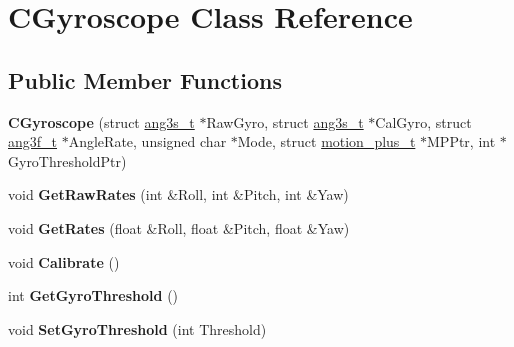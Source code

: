 \hypertarget{class_c_gyroscope}{\section{\-C\-Gyroscope \-Class \-Reference}
\label{class_c_gyroscope}
}
\subsection*{\-Public \-Member \-Functions}
\begin{DoxyCompactItemize}
\item 
\hypertarget{class_c_gyroscope_a065f7be42b432dbc9f57c0a3a9e2b88b}{{\bfseries \-C\-Gyroscope} (struct \hyperlink{structang3s__t}{ang3s\-\_\-t} $\ast$\-Raw\-Gyro, struct \hyperlink{structang3s__t}{ang3s\-\_\-t} $\ast$\-Cal\-Gyro, struct \hyperlink{structang3f__t}{ang3f\-\_\-t} $\ast$\-Angle\-Rate, unsigned char $\ast$\-Mode, struct \hyperlink{structmotion__plus__t}{motion\-\_\-plus\-\_\-t} $\ast$\-M\-P\-Ptr, int $\ast$\-Gyro\-Threshold\-Ptr)}\label{class_c_gyroscope_a065f7be42b432dbc9f57c0a3a9e2b88b}

\item 
\hypertarget{class_c_gyroscope_ab8d7db3bf44a8686d91e8fae5824af97}{void {\bfseries \-Get\-Raw\-Rates} (int \&\-Roll, int \&\-Pitch, int \&\-Yaw)}\label{class_c_gyroscope_ab8d7db3bf44a8686d91e8fae5824af97}

\item 
\hypertarget{class_c_gyroscope_a96b2a55ace21483305ef3f64bf415092}{void {\bfseries \-Get\-Rates} (float \&\-Roll, float \&\-Pitch, float \&\-Yaw)}\label{class_c_gyroscope_a96b2a55ace21483305ef3f64bf415092}

\item 
\hypertarget{class_c_gyroscope_a690a6e901390f2b57d0e48c03d00bc0f}{void {\bfseries \-Calibrate} ()}\label{class_c_gyroscope_a690a6e901390f2b57d0e48c03d00bc0f}

\item 
\hypertarget{class_c_gyroscope_a36ee104d7a2304c3b414cf48910c9fcb}{int {\bfseries \-Get\-Gyro\-Threshold} ()}\label{class_c_gyroscope_a36ee104d7a2304c3b414cf48910c9fcb}

\item 
\hypertarget{class_c_gyroscope_ace5399f8d1305a5ac8391fdaee52e32d}{void {\bfseries \-Set\-Gyro\-Threshold} (int \-Threshold)}\label{class_c_gyroscope_ace5399f8d1305a5ac8391fdaee52e32d}

\end{DoxyCompactItemize}
